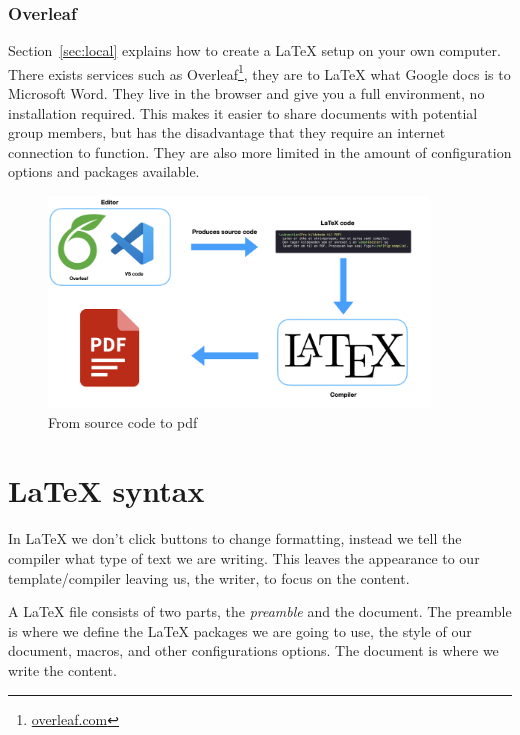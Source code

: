\documentclass{article}
\begin{document}
   \subsubsection{Overleaf}
     Section~\ref{sec:local} explains how to create a \LaTeX{} setup on your own
     computer. There exists services such as Overleaf\footnote{\url{overleaf.com}},
     they are to \LaTeX{} what Google docs is to Microsoft Word. They live in the
     browser and give you a full environment, no installation required. This makes
     it easier to share documents with potential group members, but has the
     disadvantage that they require an internet connection to function. They are
     also more limited in the amount of configuration options and packages available.

     \begin{figure}[h]
       \centering\includegraphics[width=0.9\textwidth]{../assets/compile_en.png}
       \caption{From source code to pdf}\label{fig:compile}
     \end{figure}


\section{\LaTeX{} syntax}
 In \LaTeX{} we don't click buttons to change formatting, instead we tell the
 compiler what type of text we are writing. This leaves the appearance to our
 template/compiler leaving us, the writer, to focus on the content.

 A \LaTeX{} file consists of two parts, the \emph{preamble} and the document.
 The preamble is where we define the \LaTeX{} packages we are going to use,
 the style of our document, macros, and other configurations options.
 The document is where we write the content.
\end{document}
